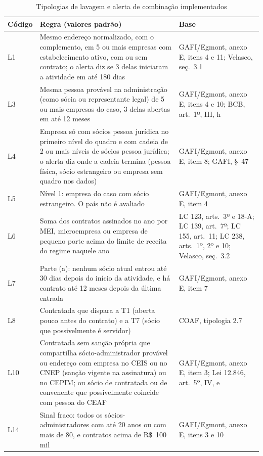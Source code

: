 \begin{small}
\begin{longtable}{p{1.3cm}p{8.4cm}p{4.6cm}}
\caption{Tipologias de lavagem e alerta de combinação implementados}\label{tab:tipologias-lavagem}\\
\hline
\textbf{Código} & \textbf{Regra (valores padrão)} & \textbf{Base} \\ \hline\endhead
L1 & Mesmo endereço normalizado, com o complemento, em 5 ou mais empresas com estabelecimento ativo, com ou sem contrato; o alerta diz se 3 delas iniciaram a atividade em até 180 dias & GAFI/Egmont, anexo E, itens 4 e 11; Velasco, seç.~3.1 \\
L3 & Mesma pessoa provável na administração (como sócia ou representante legal) de 5 ou mais empresas do caso, 3 delas abertas em até 12 meses & GAFI/Egmont, anexo E, itens 4 e 10; BCB, art.~1º, III, h \\
L4 & Empresa só com sócios pessoa jurídica no primeiro nível do quadro e com cadeia de 2 ou mais níveis de sócios pessoa jurídica; o alerta diz onde a cadeia termina (pessoa física, sócio estrangeiro ou empresa sem quadro nos dados) & GAFI/Egmont, anexo E, item 8; GAFI, §~47 \\
L5 & Nível 1: empresa do caso com sócio estrangeiro. O país não é avaliado & GAFI/Egmont, anexo E, item 4 \\
L6 & Soma dos contratos assinados no ano por MEI, microempresa ou empresa de pequeno porte acima do limite de receita do regime naquele ano & LC 123, arts.~3º e 18-A; LC 139, art.~7º; LC 155, art.~11; LC 238, arts.~1º, 2º e 10; Velasco, seç.~3.2 \\
L7 & Parte (a): nenhum sócio atual entrou até 30 dias depois do início da atividade, e há contrato até 12 meses depois da última entrada & GAFI/Egmont, anexo E, item 7 \\
L8 & Contratada que dispara a T1 (aberta pouco antes do contrato) e a T7 (sócio que possivelmente é servidor) & COAF, tipologia 2.7 \\
L10 & Contratada sem sanção própria que compartilha sócio-administrador provável ou endereço com empresa no CEIS ou no CNEP (sanção vigente na assinatura) ou no CEPIM; ou sócio de contratada ou de convenente que possivelmente coincide com pessoa do CEAF & GAFI/Egmont, anexo E, item 3; Lei 12.846, art.~5º, IV, e \\
L14 & Sinal fraco: todos os sócios-administradores com até 20 anos ou com mais de 80, e contratos acima de R\$~100 mil & GAFI/Egmont, anexo E, itens 3 e 10 \\

\end{longtable}
\end{small}
